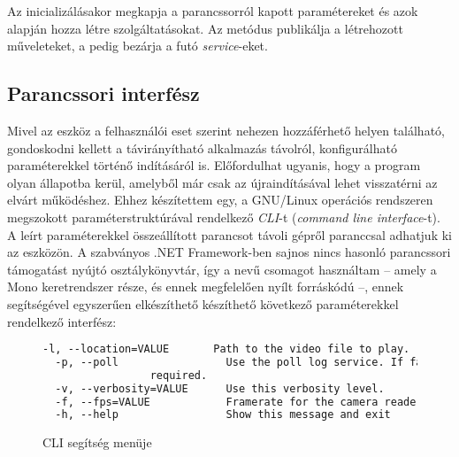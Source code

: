 Az  inicializálásakor megkapja a parancssorról kapott paramétereket és azok alapján hozza létre szolgáltatásokat. Az  metódus publikálja a létrehozott műveleteket, a  pedig bezárja a futó \emph{service}-eket.

\subsection{Parancssori interfész} \label{subs:cli}

Mivel az eszköz a felhasználói eset szerint nehezen hozzáférhető helyen található, gondoskodni kellett a távirányítható alkalmazás távolról, konfigurálható paraméterekkel történő indításáról is. Előfordulhat ugyanis, hogy a program olyan állapotba kerül, amelyből már csak az újraindításával lehet visszatérni az elvárt működéshez. Ehhez készítettem egy, a GNU/Linux operációs rendszeren megszokott paraméterstruktúrával rendelkező \emph{CLI}-t (\emph{command line interface}-t). A leírt paraméterekkel összeállított parancsot távoli gépről  paranccsal adhatjuk ki az eszközön. A szabványos .NET Framework-ben sajnos nincs hasonló parancssori támogatást nyújtó osztálykönyvtár, így a   nevű csomagot használtam -- amely a Mono keretrendszer része, és ennek megfelelően nyílt forráskódú --, ennek segítségével egyszerűen elkészíthető készíthető következő paraméterekkel rendelkező interfész:

\begin{figure}[h]
\centering
\begin{minipage}{1\textwidth}
\begin{mdframed}[backgroundcolor=gray!20]
\begin{scriptsize}
\begin{lstlisting}[language=xml]
  -l, --location=VALUE       Path to the video file to play.
  -p, --poll                 Use the poll log service. If false, duplex binding is
  			     required.
  -v, --verbosity=VALUE      Use this verbosity level.
  -f, --fps=VALUE            Framerate for the camera reader.
  -h, --help                 Show this message and exit
\end{lstlisting}
\end{scriptsize}
\end{mdframed}
\end{minipage}
\caption{CLI segítség menüje} \label{figure:cli_help}
\end{figure}


